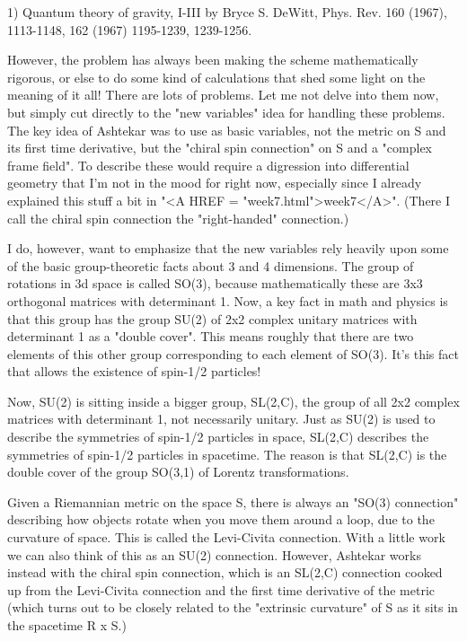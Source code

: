 1) Quantum theory of gravity, I-III by Bryce S. DeWitt, Phys. Rev. 160
(1967), 1113-1148, 162 (1967) 1195-1239, 1239-1256. 


However, the problem has always been making the scheme mathematically
rigorous, or else to do some kind of calculations that shed some light
on the meaning of it all!  There are lots of problems.  Let me not delve
into them now, but simply cut directly to the "new variables" idea
for handling these problems.  The key idea of Ashtekar was to use as basic
variables, not the metric on S and its first time derivative, but the
"chiral spin connection" on S and a "complex frame field".  To
describe these would require a digression into differential geometry
that I'm not in the mood for right now, especially since I already
explained this stuff a bit in "<A HREF = "week7.html">week7</A>".  (There I call the chiral spin
connection the "right-handed" connection.)  

I do, however, want to emphasize that the new variables rely heavily upon
some of the basic group-theoretic facts about 3 and 4 dimensions.  
The group of rotations in 3d space is called SO(3), because
mathematically these are 3x3 orthogonal matrices with determinant 1.  
Now, a key fact in math and physics is that this group has the group
SU(2) of 2x2 complex unitary matrices with determinant 1 as a "double
cover".   This means roughly that there are two elements of this other
group corresponding to each element of SO(3).  It's this fact that
allows the existence of spin-1/2 particles!  

Now, SU(2) is sitting inside a bigger group, SL(2,C), the group of all
2x2 complex matrices with determinant 1, not necessarily unitary.  
Just as SU(2) is used to describe the symmetries of spin-1/2 particles
in space, SL(2,C) describes the symmetries of spin-1/2 particles in
spacetime.  The reason is that SL(2,C) is the double cover of the group
SO(3,1) of Lorentz transformations. 

Given a Riemannian metric on the space S, there is always an "SO(3)
connection" describing how objects rotate when you move them around a
loop, due to the curvature of space.  This is called the Levi-Civita
connection.  With a little work we can also think of this as an SU(2)
connection.  However, Ashtekar works instead with the chiral spin
connection, which is an SL(2,C) connection cooked up from the
Levi-Civita connection and the first time derivative of the metric
(which turns out to be closely related to the "extrinsic curvature" of S
as it sits in the spacetime R x S.)

